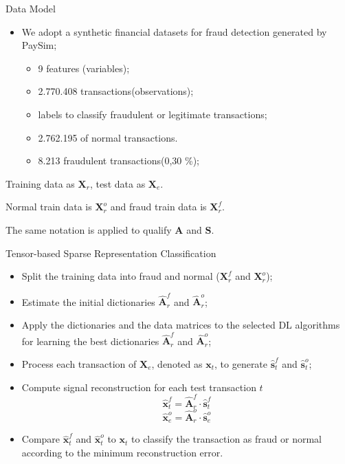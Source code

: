 \documentclass[newPxFont, numfooter, sectionpages]{beamer}
\begin{document}
\begin{frame}[c]{Data Model}

	\begin{itemize}
		\item We adopt a synthetic financial datasets for fraud detection generated by PaySim;
		\begin{itemize}
			\item 9 features (variables);
			\item 2.770.408 transactions(observations);
			\item labels to classify fraudulent or legitimate transactions;
			\item 2.762.195 of normal transactions.
			\item 8.213 fraudulent transactions(0,30 \%);
		\end{itemize}
	\end{itemize}

	Training data as $\textbf{X}_r$,  test data as $\textbf{X}_e$. 

	Normal train data is $\textbf{X}_r^o$ and fraud train data is $\textbf{X}_r^f$. 

	The same notation is applied to qualify $\textbf{A}$ and $\textbf{S}$.

\end{frame}
\begin{frame}[c]{Tensor-based Sparse Representation Classification}

	\begin{itemize}
		\item Split the training data into fraud and normal ($\textbf{X}_r^f$ and $\textbf{X}_r^o$);
		\item Estimate the initial dictionaries $\hat{\textbf{A}}_r^f$ and $\hat{\textbf{A}}_r^o$;
		\item Apply the dictionaries and the data matrices to the selected DL algorithms for learning the best dictionaries $\hat{\textbf{A}}_r^f$ and $\hat{\textbf{A}}_r^o$;
		\item Process each transaction of $\textbf{X}_e$, denoted as $\textbf{x}_t$, to generate  $\hat{\textbf{s}}_t^f$ and $\hat{\textbf{s}}_t^o$;
		\item Compute signal reconstruction for each test transaction $t$
			\begin{equation}\label{eq:4_eq041}
				\hat{\textbf{x}}_t^f = \hat{\textbf{A}}_r^f \cdot \hat{\textbf{s}}_t^f
			\end{equation}
			\begin{equation}\label{eq:4_eq042}
				\hat{\textbf{x}}_e^o = \hat{\textbf{A}}_r^o \cdot \hat{\textbf{s}}_e^o
			\end{equation}
		\item Compare $\hat{\textbf{x}}_t^f$ and $\hat{\textbf{x}}_t^o$ to $\textbf{x}_t$ to classify the transaction as fraud or normal according to the minimum reconstruction error.
	\end{itemize}

\end{frame}
\end{document}
